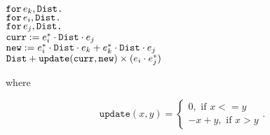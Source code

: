 
\noindent
$\texttt{for}\, e_k,\texttt{Dist} \texttt{.}\, $
\\
\hspace*{0.5cm} $\texttt{for}\, e_i,\texttt{Dist} \texttt{.}\, $
\\
\hspace*{1cm} $\texttt{for}\, e_j,\texttt{Dist} \texttt{.}\, $
\\
\hspace*{1.5cm} 
$\texttt{curr} := e_i^*\cdot \texttt{Dist} \cdot e_j$\\
\hspace*{1.5cm} 
$\texttt{new} := e_i^*\cdot \texttt{Dist} \cdot e_k + e_k^*\cdot \texttt{Dist}\cdot e_j$\\
\hspace*{1.5cm}
$\texttt{Dist} + \texttt{update}(\texttt{curr},\texttt{new})\times (e_i\cdot e_j^*)$

where

\[
  			\texttt{update}(x,y)=\begin{cases}
               0, \text{ if } x<=y \\
               -x + y, \text{ if } x > y
            \end{cases}.
		\]
